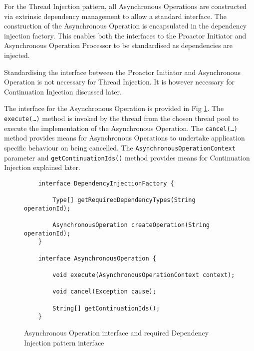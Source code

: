 \documentclass[prodmode]{style/acmlarge}
\begin{document}
For the Thread Injection pattern, all Asynchronous Operations are constructed
via extrinsic dependency management \cite{ioc} to allow a standard interface.
The construction of the Asynchronous Operation is encapsulated in the dependency
injection factory.  This enables both the interfaces to the Proactor Initiator
and Asynchronous Operation Processor to be standardised as dependencies are
injected.

Standardising the interface between the Proactor Initiator and Asynchronous
Operation is not necessary for Thread Injection.  It is however necessary for
Continuation Injection discussed later.

The interface for the Asynchronous Operation is provided in Fig
\ref{fig:AO_interface_AOP}.  The \texttt{execute(\ldots)} method is invoked by
the thread from the chosen thread pool to execute the implementation of the
Asynchronous Operation.  The \texttt{cancel(\ldots)} method provides means for
Asynchronous Operations to undertake application specific behaviour on being
cancelled.  The \texttt{AsynchronousOperationContext} parameter and
\texttt{getContinuationIds()} method provides means for Continuation Injection
explained later.

\begin{figure}[tp]
\centering
\begin{verbatim}
    interface DependencyInjectionFactory {
    
        Type[] getRequiredDependencyTypes(String operationId);
        
        AsynchronousOperation createOperation(String operationId);
    }

    interface AsynchronousOperation {
    
        void execute(AsynchronousOperationContext context);
        
        void cancel(Exception cause);
        
        String[] getContinuationIds();
    }
\end{verbatim}
\caption{Asynchronous Operation interface and required Dependency Injection pattern interface\footnotemark}
\label{fig:AO_interface_AOP}
\end{figure}
\end{document}
